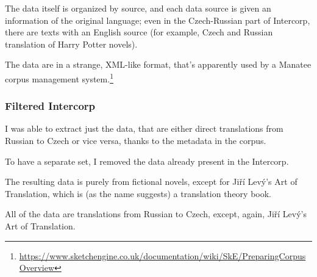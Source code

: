 The data itself is organized by source, and each data source is given an information of the original language; even in the Czech-Russian part of Intercorp, there are texts with an English source (for example, Czech and Russian translation of Harry Potter novels). 

The data are in a strange, XML-like format, that's apparently used by a Manatee corpus management system.\footnote{\url{https://www.sketchengine.co.uk/documentation/wiki/SkE/PreparingCorpusOverview}}

\subsubsection{Filtered Intercorp}

I was able to extract just the data, that are either direct translations from Russian to Czech or vice versa, thanks to the metadata in the corpus.

To have a separate set, I removed the data already present in the  Intercorp.

The resulting data is purely from fictional novels, except for Jiří Levý's Art of Translation, which is (as the name suggests) a translation theory book.

All of the data are translations from Russian to Czech, except, again, Jiří Levý's Art of Translation.

